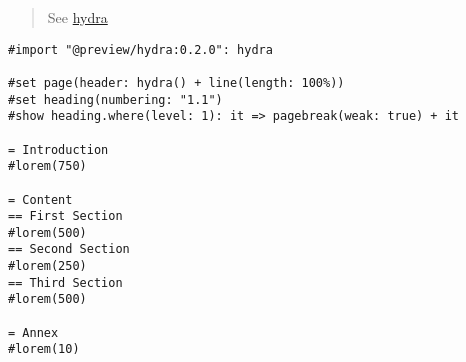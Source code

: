 \begin{quote}
See \href{https://github.com/tingerrr/hydra}{hydra}
\end{quote}

\begin{verbatim}
#import "@preview/hydra:0.2.0": hydra

#set page(header: hydra() + line(length: 100%))
#set heading(numbering: "1.1")
#show heading.where(level: 1): it => pagebreak(weak: true) + it

= Introduction
#lorem(750)

= Content
== First Section
#lorem(500)
== Second Section
#lorem(250)
== Third Section
#lorem(500)

= Annex
#lorem(10)
\end{verbatim}

\pandocbounded{}

\pandocbounded{}

\pandocbounded{}

\pandocbounded{}

\pandocbounded{}
